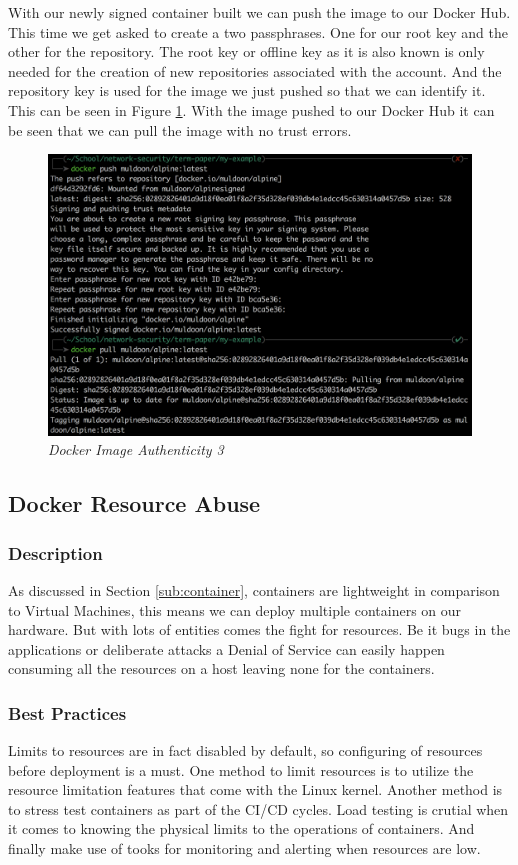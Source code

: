 With our newly signed container built we can push the image to our Docker Hub. This time we get asked to create a two passphrases. One for our root key and the other for the repository. The root key or offline key as it is also known is only needed for the creation of new repositories associated with the account. And the repository key is used for the image we just pushed so that we can identify it. This can be seen in Figure \ref{img:demo10}. With the image pushed to our Docker Hub it can be seen that we can pull the image with no trust errors.
\begin{figure}[!ht]
\centering
\includegraphics*[width=\textwidth]{images/term10.png}
\caption{\em Docker Image Authenticity 3}
\label{img:demo10}
\end{figure}

\subsection{Docker Resource Abuse}
\label{sub:abuse}
\subsubsection{Description}
As discussed in Section \ref{sub:container}, containers are lightweight in comparison to Virtual Machines, this means we can deploy multiple containers on our hardware. But with lots of entities comes the fight for resources. Be it bugs in the applications or deliberate attacks a Denial of Service can easily happen consuming all the resources on a host leaving none for the containers. 
\subsubsection{Best Practices}
Limits to resources are in fact disabled by default, so configuring of resources before deployment is a must. One method to limit resources is to utilize the resource limitation features that come with the Linux kernel. Another method is to stress test containers as part of the CI/CD cycles. Load testing is crutial when it comes to knowing the physical limits to the operations of containers. And finally make use of tooks for monitoring and alerting when resources are low.
